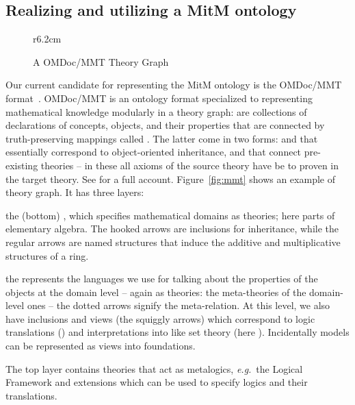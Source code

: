 \subsection{Realizing and utilizing a MitM ontology}

\begin{wrapfigure}r{6.2cm}\centering\vspace*{-2em}
  \vspace*{-.5em}
  \caption{A OMDoc/MMT Theory Graph}\label{fig:mmt}\vspace*{-1em}
  \label{figure.omdoc.example}
\end{wrapfigure}
Our current candidate for representing the MitM ontology is the OMDoc/MMT
format~\cite{Kohlhase:OMDoc1.2,MMTSVN:on}. OMDoc/MMT is an ontology format specialized to
representing mathematical knowledge modularly in a theory graph:  are
collections of declarations of concepts, objects, and their properties that are connected
by truth-preserving mappings called . The latter come in two
forms:  and  that essentially correspond to
object-oriented inheritance, and  that connect pre-existing theories -- in
these all axioms of the source theory have be to proven in the target theory. See
 \cite{RabKoh:WSMSML13} for a full account. Figure~\ref{fig:mmt} shows an example of
theory graph. It has three layers:
\begin{compactenum}[\em i\rm)]
\item the (bottom) , which specifies mathematical domains as theories; here
  parts of elementary algebra. The hooked arrows are inclusions for inheritance, while the
  regular arrows are named structures that induce the additive and multiplicative
  structures of a ring.
\item the  represents the languages we use for talking about the
  properties of the objects at the domain level -- again as theories: the meta-theories of
  the domain-level ones -- the dotted arrows signify the meta-relation. At this level, we
  also have inclusions and views (the squiggly arrows) which correspond to logic
  translations () and interpretations into  like
  set theory (here ). Incidentally models can be represented as views into
  foundations. 
\item The top layer contains theories that act as metalogics, \emph{e.g.}\ the Logical Framework
   and extensions which can be used to specify logics and their translations.
\end{compactenum}
